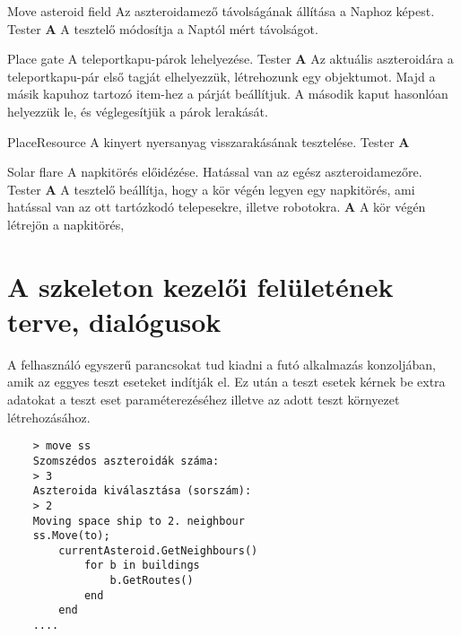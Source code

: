 \documentclass[../../projlab]{subfiles}
\begin{document}
\begin{use-case}
    {Move asteroid field}
    {Az aszteroidamező távolságának állítása a Naphoz képest.}
    {Tester} 
    \textbf{A} A tesztelő módosítja a Naptól mért távolságot. \newline
\end{use-case}

\begin{use-case}
    {Place gate}
    {A teleportkapu-párok lehelyezése. }
    {Tester} 
    \textbf{A}  Az aktuális aszteroidára a teleportkapu-pár első tagját elhelyezzük, létrehozunk egy objektumot. Majd a másik kapuhoz tartozó item-hez a párját beállítjuk. A második kaput hasonlóan helyezzük le, és véglegesítjük a párok lerakását. \newline
\end{use-case}

\begin{use-case}
    {PlaceResource}
    {A kinyert nyersanyag visszarakásának tesztelése.}
    {Tester} 
    \textbf{A}  \newline
\end{use-case}

\begin{use-case}
    {Solar flare}
    {A napkitörés előidézése. Hatással van az egész aszteroidamezőre.}
    {Tester} 
    \textbf{A} A tesztelő beállítja, hogy a kör végén legyen egy napkitörés, ami hatással van az ott tartózkodó telepesekre, illetve robotokra. \newline
    \textbf{A} A kör végén létrejön a napkitörés, \newline
\end{use-case}



\section{A szkeleton kezelői felületének terve, dialógusok}

A felhasználó egyszerű parancsokat tud kiadni a futó alkalmazás konzoljában, amik az eggyes teszt eseteket indítják el.
Ez után a teszt esetek kérnek be extra adatokat a teszt eset paraméterezéséhez illetve az adott teszt környezet létrehozásához.

\begin{verbatim}
    > move ss
    Szomszédos aszteroidák száma:
    > 3
    Aszteroida kiválasztása (sorszám):
    > 2
    Moving space ship to 2. neighbour
    ss.Move(to);
        currentAsteroid.GetNeighbours()
            for b in buildings
                b.GetRoutes()
            end
        end
    ....

\end{verbatim}
\end{document}
